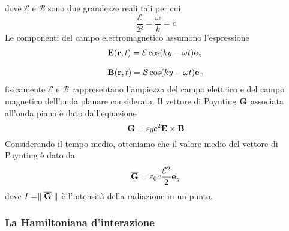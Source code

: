 dove $\mathcal{E}$ e $\mathcal{B}$ sono due grandezze reali tali per cui
\begin{equation}
	\frac{\mathcal{E}}{\mathcal{B}} = \frac{\omega}{k} = c
\end{equation}
Le componenti del campo elettromagnetico assumono l'espressione
\begin{align*}
& \bold{E}(\bold{r},t) = \mathcal{E} \cos(ky-\omega t) \bold{e}_{z} \\[0.3cm]
& \bold{B}(\bold{r},t) = \mathcal{B} \cos(ky - \omega t) \bold{e}_{x}
\end{align*}
fisicamente $\mathcal{E}$ e $\mathcal{B}$ rappresentano l'ampiezza del campo elettrico e del campo magnetico dell'onda planare considerata. Il vettore di Poynting $\bold{G}$ associata all'onda piana \`e dato dall'equazione 
\begin{equation*}
	\bold{G} = \varepsilon_0 c^2 \bold{E} \times \bold{B}
\end{equation*}
Considerando il tempo medio, otteniamo che il valore medio del vettore di Poynting \`e dato da
\begin{equation*}
	\overline{\bold{G}} = \varepsilon_0 c \frac{\mathcal{E}^2}{2}\bold{e}_y
\end{equation*}
dove $I = \parallel\overline{\bold{G}} \parallel $ \`e l'intensit\`a della radiazione in un punto.

\subsubsection{La Hamiltoniana d'interazione}
 
